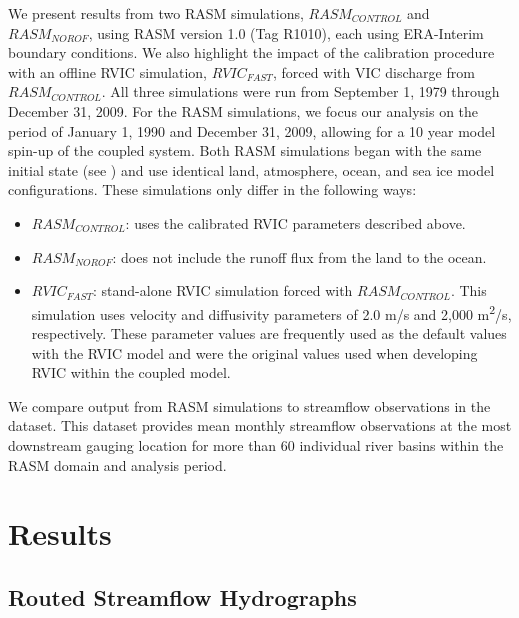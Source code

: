 \documentclass[jgrga, draft]{agutex}
\begin{document}
\begin{article}
We present results from two RASM simulations, $RASM_{CONTROL}$ and $RASM_{NOROF}$, using RASM version 1.0 (Tag R1010), each using ERA-Interim boundary conditions.
We also highlight the impact of the calibration procedure with an offline RVIC simulation, $RVIC_{FAST}$, forced with VIC discharge from $RASM_{CONTROL}$.
All three simulations were run from September 1, 1979 through December 31, 2009.
For the RASM simulations, we focus our analysis on the period of January 1, 1990 and December 31, 2009, allowing for a 10 year model spin-up of the coupled system.
Both RASM simulations began with the same initial state (see \citet{Hamman_2016}) and use identical land, atmosphere, ocean, and sea ice model configurations.
These simulations only differ in the following ways:
\begin{itemize}
     \item $RASM_{CONTROL}$: uses the calibrated RVIC parameters described above.
     \item $RASM_{NOROF}$: does not include the runoff flux from the land to the ocean.
     \item $RVIC_{FAST}$: stand-alone RVIC simulation forced with $RASM_{CONTROL}$.
          This simulation uses velocity and diffusivity parameters of 2.0 m/s and 2,000 m\textsuperscript{2}/s, respectively.
          These parameter values are frequently used as the default values with the RVIC model and were the original values used when developing RVIC within the coupled model.
\end{itemize}

We compare output from RASM simulations to streamflow observations in the \citet{Dai_2009} dataset.
This dataset provides mean monthly streamflow observations at the most downstream gauging location for more than 60 individual river basins within the RASM domain and analysis period.

\section{Results}
\label{sec:results}

\subsection{Routed Streamflow Hydrographs}
\label{sec:hydrographs}


\end{article}
\end{document}
